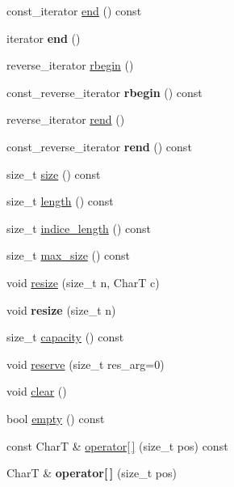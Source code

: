 \begin{CompactItemize}
\item 
const\_\-iterator \hyperlink{classbbt__string_0ef119a4b2c850ae106876ab9d276977}{end} () const 
\item 
\hypertarget{classbbt__string_7e81c60e19fd6cd31b1ffcf17fc1a97b}{
iterator \textbf{end} ()}
\label{classbbt__string_7e81c60e19fd6cd31b1ffcf17fc1a97b}

\item 
reverse\_\-iterator \hyperlink{classbbt__string_f65ad28bf03b76f6fe2dee8cc866a2e0}{rbegin} ()
\item 
\hypertarget{classbbt__string_54ebd122f7be1bd240581301c331926a}{
const\_\-reverse\_\-iterator \textbf{rbegin} () const }
\label{classbbt__string_54ebd122f7be1bd240581301c331926a}

\item 
reverse\_\-iterator \hyperlink{classbbt__string_7f39c0149a22f0d7b9fe1ce776fa2605}{rend} ()
\item 
\hypertarget{classbbt__string_a29d243b3cdc853a1846cd34187aecee}{
const\_\-reverse\_\-iterator \textbf{rend} () const }
\label{classbbt__string_a29d243b3cdc853a1846cd34187aecee}

\item 
size\_\-t \hyperlink{classbbt__string_d702780b8d0a6de141d9a02ab0b7b0a0}{size} () const 
\item 
size\_\-t \hyperlink{classbbt__string_09ba144b09ca3da53d028a4fd4209c1d}{length} () const 
\item 
size\_\-t \hyperlink{classbbt__string_f7d72888ed6e7c1b6f07d515b08b90dd}{indice\_\-length} () const 
\item 
size\_\-t \hyperlink{classbbt__string_dad344768ef0b5b3349b37360ddf635c}{max\_\-size} () const 
\item 
void \hyperlink{classbbt__string_9a3f14ffd3caa23664570a059f5f7626}{resize} (size\_\-t n, CharT c)
\item 
\hypertarget{classbbt__string_549e0c2ff0157f6d4cf6456c9ee04515}{
void \textbf{resize} (size\_\-t n)}
\label{classbbt__string_549e0c2ff0157f6d4cf6456c9ee04515}

\item 
size\_\-t \hyperlink{classbbt__string_43171d8b0097837372a408ec693559e6}{capacity} () const 
\item 
void \hyperlink{classbbt__string_2c7fe2805ecfdf1d9ddcd66c4e5c80f1}{reserve} (size\_\-t res\_\-arg=0)
\item 
void \hyperlink{classbbt__string_7cf658cb2b605dbc1c808e41f9e65b2d}{clear} ()
\item 
bool \hyperlink{classbbt__string_1a6fd2f8eaa83d6f9b33cc01f71af594}{empty} () const 
\item 
const CharT \& \hyperlink{classbbt__string_40427f0c3552b431b087c9d4c0684f85}{operator\mbox{[}$\,$\mbox{]}} (size\_\-t pos) const 
\item 
\hypertarget{classbbt__string_3516fba9266146eefbf517b1b317c925}{
CharT \& \textbf{operator\mbox{[}$\,$\mbox{]}} (size\_\-t pos)}
\label{classbbt__string_3516fba9266146eefbf517b1b317c925}


\end{CompactItemize}
